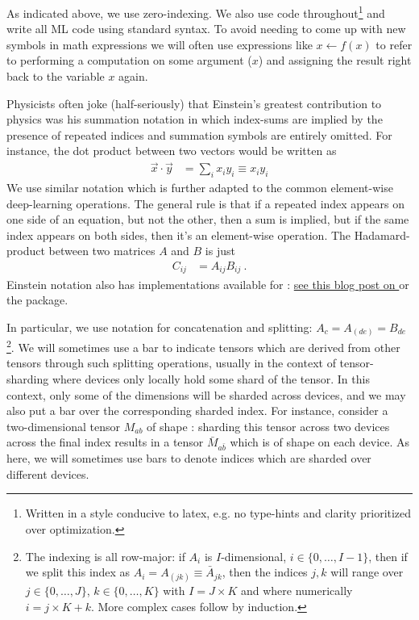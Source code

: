 \documentclass[11pt]{article}
\begin{document}
As indicated above,  we use zero-indexing. We also use  code
throughout\footnote{Written in a style conducive to latex, e.g. no type-hints and clarity
prioritized over optimization.}  and write all ML code using standard  syntax. To
avoid needing to come up with new symbols in math expressions we will often use expressions like $ x
\leftarrow f(x) $ to refer to performing a computation on some argument ($ x $) and assigning the
result right back to the variable $ x $ again.

Physicists often joke (half-seriously) that Einstein's greatest contribution to physics was his
summation notation in which index-sums are implied by the presence of repeated indices and summation
symbols are entirely omitted. For instance, the dot product between two vectors would be written as
\begin{align}
	\vec{x} \cdot \vec{y} & = \sum _{ i } x _{ i } y _{ i } \equiv x _{ i } y _{  i }
	\label{app_eq_einstein_sum}
\end{align}
We use similar notation which is further adapted to the common element-wise deep-learning
operations.  The general rule is that if a repeated index appears on one side of an equation, but
not the other, then a sum is implied, but if the same index appears on both sides, then it's an
element-wise operation. The Hadamard-product between two matrices $ A $ and $ B $ is just
\begin{align}
	C _{ ij } & = A _{ ij } B _{ ij }\ .
\end{align}
Einstein notation also has implementations available for :
\href{https://rockt.github.io/2018/04/30/einsum}{see this blog post on } or the
\href{https://einops.rocks/1-einops-basics/}{} package.

In particular, we use  notation for concatenation and splitting: $ A _{ c } = A _{
    (de) }= B _{ de } $\footnote{The indexing is all row-major: if $ A _{ i } $ is $
        I$-dimensional, $ i \in \{0, \ldots, I-1\} $, then if we split this index as $ A _{ i } = A
        _{ (jk) } \equiv \bar{A} _{ jk } $, then the indices $ j, k $ will range over $ j \in \{0,
    \ldots , J\} $, $ k\in \{0, \ldots , K\} $ with $ I =J \times K $ and where numerically $ i = j
\times K + k $. More complex cases follow by induction.}. We will sometimes use a bar to indicate
tensors which  are derived from other tensors through such splitting operations, usually in the
context of tensor-sharding where devices only locally hold some shard of the tensor. In this
context, only some of the dimensions will be sharded across devices, and we may also put a bar over
the corresponding sharded index. For instance, consider a two-dimensional tensor $ M _{ ab } $ of
shape : sharding this tensor across two devices across the final index
results in a tensor $ \bar{M}_{ a \bar{b} } $ which is of shape  on
each device. As here, we will sometimes use bars to denote indices which are sharded over different
devices.
\end{document}
